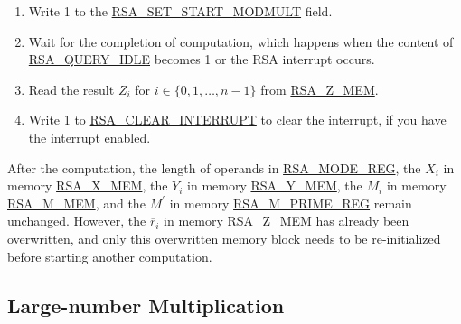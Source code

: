 \documentclass[main\_\_EN.tex]{subfiles}
\begin{document}
\begin{enumerate}
        Users need to write data to each memory block only according to the length of the number; data beyond this length are ignored.

    \item Write 1 to the \hyperref[fielddesc:RSASETSTARTMODMULT]{RSA\_SET\_START\_MODMULT} field.

    \item Wait for the completion of computation, which happens when the content of \hyperref[fielddesc:RSAQUERYIDLE]{RSA\_QUERY\_IDLE} becomes 1 or the RSA interrupt occurs.
    
    \item Read the result \begin{math}Z_{i}\end{math} for \begin{math}i \in \{ 0, 1, \dots, n-1 \} \end{math} from \hyperref[regdesc:RSAmemory]{RSA\_Z\_MEM}.
    \item Write 1 to \hyperref[fielddesc:RSACLEARINTERRUPT]{RSA\_CLEAR\_INTERRUPT} to clear the interrupt, if you have the interrupt enabled.

\end{enumerate}

After the computation, the length of operands in \hyperref[regdesc:RSAMODEREG]{RSA\_MODE\_REG}, the \begin{math}X_{i}\end{math} in memory \hyperref[regdesc:RSAmemory]{RSA\_X\_MEM}, the \begin{math}Y_{i}\end{math} in memory \hyperref[regdesc:RSAmemory]{RSA\_Y\_MEM}, the \begin{math}M_{i}\end{math} in memory \hyperref[regdesc:RSAmemory]{RSA\_M\_MEM}, and the \begin{math}M^{\prime}\end{math} in memory \hyperref[regdesc:RSAMPRIMEREG]{RSA\_M\_PRIME\_REG} remain unchanged. However, the \begin{math}\overline{r}_{i}\end{math} in memory \hyperref[regdesc:RSAmemory]{RSA\_Z\_MEM} has already been overwritten, and only this overwritten memory block needs to be re-initialized before starting another computation.

\subsection{Large-number Multiplication}
\end{document}
